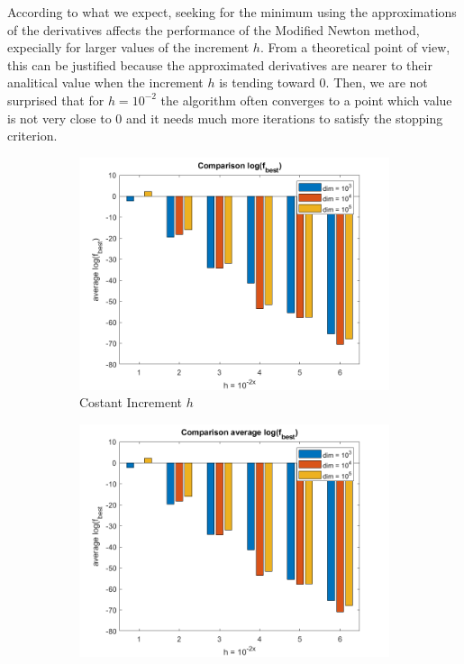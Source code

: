 According to what we expect, seeking for the minimum using the approximations of the derivatives affects the performance of the Modified Newton method, expecially for larger values of the increment $h$. From a theoretical point of view, this can be justified because the approximated derivatives are nearer to their analitical value when the increment $h$ is tending toward $0$.
Then, we are not surprised that for $h = 10^{-2}$ the algorithm often converges to a point which value is not very close to $0$ and it needs much more iterations to satisfy the stopping criterion.

\begin{figure}[htbp]
    \centering
    \begin{subfigure}[t]{0.45\textwidth}  %
        \centering
        \includegraphics[width=\textwidth]{img/pb25_MN_difffinite_COST_log(fbest).png}
        \caption{Costant Increment $h$}
    \end{subfigure}
    \hspace{1cm} %
    \begin{subfigure}[t]{0.45\textwidth}
        \centering
        \includegraphics[width=\textwidth]{img/pb25_MN_difffinite_REL_log(fbest).png}

\end{subfigure}
\end{figure}
